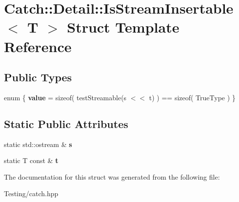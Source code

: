 \hypertarget{struct_catch_1_1_detail_1_1_is_stream_insertable}{\section{Catch\-:\-:Detail\-:\-:Is\-Stream\-Insertable$<$ T $>$ Struct Template Reference}
\label{struct_catch_1_1_detail_1_1_is_stream_insertable}
}
\subsection*{Public Types}
\begin{DoxyCompactItemize}
\item 
enum \{ {\bfseries value} = sizeof( test\-Streamable(s $<$$<$ t) ) == sizeof( True\-Type )
 \}
\end{DoxyCompactItemize}
\subsection*{Static Public Attributes}
\begin{DoxyCompactItemize}
\item 
\hypertarget{struct_catch_1_1_detail_1_1_is_stream_insertable_abe3d3c8e5d85665747faafffc9a96b00}{static std\-::ostream \& {\bfseries s}}\label{struct_catch_1_1_detail_1_1_is_stream_insertable_abe3d3c8e5d85665747faafffc9a96b00}

\item 
\hypertarget{struct_catch_1_1_detail_1_1_is_stream_insertable_a7d2a3da978b6736667a7b2f6d51f507f}{static T const \& {\bfseries t}}\label{struct_catch_1_1_detail_1_1_is_stream_insertable_a7d2a3da978b6736667a7b2f6d51f507f}

\end{DoxyCompactItemize}


The documentation for this struct was generated from the following file\-:\begin{DoxyCompactItemize}
\item 
Testing/catch.\-hpp\end{DoxyCompactItemize}
